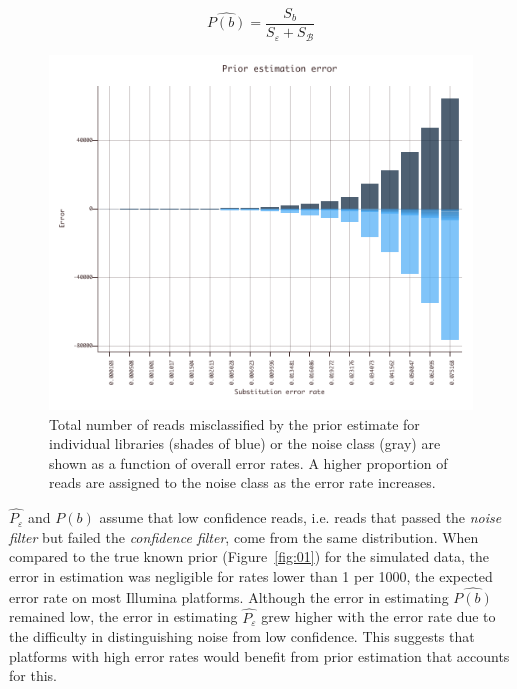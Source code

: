 \documentclass[twocolumn]{bmcart}
\begin{document}
%
\begin{equation}
\hat{P(b)} = \frac{S_{b}}{S_{\varepsilon} + S_\mathcal{B}}
\end{equation}
%

\begin{figure}[h!]
\centering
\includegraphics[keepaspectratio,scale=1]{decoder_prior}
\caption{ Total number of reads misclassified by the prior estimate for individual libraries (shades of blue) or the noise class (gray) are shown as a function of overall error rates. A higher proportion of reads are assigned to the noise class as the error rate increases.}
\end{figure}

$\hat{P_{\varepsilon}}$ and $\hat{P(b)}$ assume that low confidence reads, i.e. reads that passed the  \emph{noise filter} but failed the \emph{confidence filter}, come from the same distribution. When compared to the true known prior (Figure~\ref{fig:01}) for the simulated data, the error in estimation was negligible for rates lower than 1 per 1000, the expected error rate on most Illumina platforms. Although the error in estimating $\hat{P(b)}$ remained low, the error in estimating $\hat{P_{\varepsilon}}$ grew higher with the error rate due to the difficulty in distinguishing noise from low confidence. This suggests that platforms with high error rates would benefit from prior estimation that accounts for this.
\end{document}
